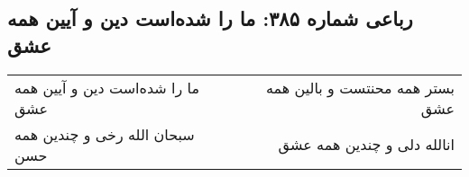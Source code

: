 \begin{center}
\section*{رباعی شماره ۳۸۵: ما را شده‌است دین و آیین همه عشق}
\label{sec:sh385}
\begin{longtable}{l p{0.5cm} r}
ما را شده‌است دین و آیین همه عشق
&&
بستر همه محنتست و بالین همه عشق
\\
سبحان الله رخی و چندین همه حسن
&&
انالله دلی و چندین همه عشق
\\
\end{longtable}
\end{center}
